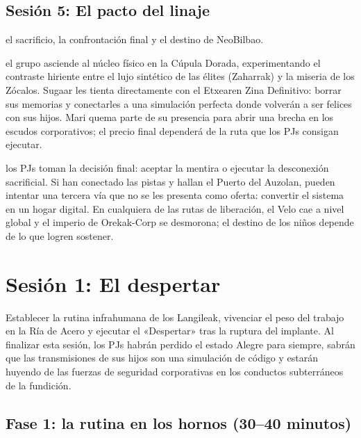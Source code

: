 \subsection{Sesión 5: El pacto del linaje}
 el sacrificio, la confrontación final y el destino de NeoBilbao.\par
{} el grupo asciende al núcleo físico en la Cúpula Dorada, experimentando el contraste hiriente entre el lujo sintético de las élites (Zaharrak) y la miseria de los Zócalos. Sugaar les tienta directamente con el Etxearen Zina Definitivo: borrar sus memorias y conectarles a una simulación perfecta donde volverán a ser felices con sus hijos. Mari quema parte de su presencia para abrir una brecha en los escudos corporativos; el precio final dependerá de la ruta que los PJs consigan ejecutar.\par
{} los PJs toman la decisión final: aceptar la mentira o ejecutar la desconexión sacrificial. Si han conectado las pistas y hallan el Puerto del Auzolan, pueden intentar una tercera vía que no se les presenta como oferta: convertir el sistema en un hogar digital. En cualquiera de las rutas de liberación, el Velo cae a nivel global y el imperio de Orekak-Corp se desmorona; el destino de los niños depende de lo que logren sostener.

\section{Sesión 1: El despertar}


 Establecer la rutina infrahumana de los Langileak, vivenciar el peso del trabajo en la Ría de Acero y ejecutar el «Despertar» tras la ruptura del implante. Al finalizar esta sesión, los PJs habrán perdido el estado Alegre para siempre, sabrán que las transmisiones de sus hijos son una simulación de código y estarán huyendo de las fuerzas de seguridad corporativas en los conductos subterráneos de la fundición.

\subsection{Fase 1: la rutina en los hornos (30--40 minutos)}


